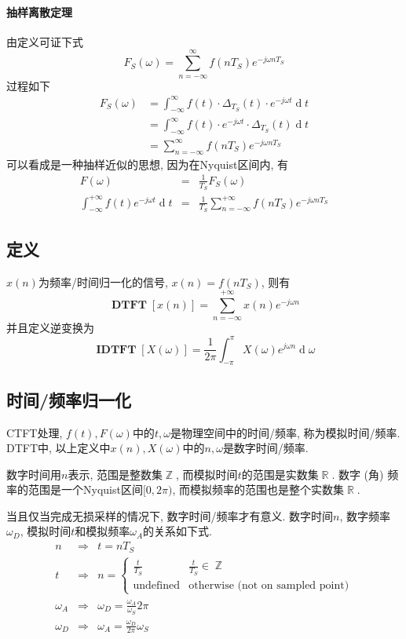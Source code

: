 \documentclass{ctexart}
\DeclareMathOperator{\DTFT}{\mathbf{DTFT}}
\DeclareMathOperator{\IDTFT}{\mathbf{IDTFT}}
\DeclareMathOperator{\ud}{\mathrm{d}}
\DeclareMathOperator{\Rset}{\mathbb{R}}
\DeclareMathOperator{\Zset}{\mathbb{Z}}
\begin{document}
\paragraph{抽样离散定理} 由定义可证下式
    \[F_S(\omega) = \sum_{n=-\infty}^{\infty} f(nT_S) e^{- j \omega n T_S}\]过程如下
    \begin{align*}
        F_S(\omega) &= \int_{-\infty}^{\infty} f(t) \cdot \Delta_{T_S}(t) \cdot e^{-j \omega t} \ud t\\
            &= \int_{-\infty}^{\infty} f(t) \cdot e^{-j \omega t} \cdot \Delta_{T_S}(t) \ud t\\
            &= \sum_{n=-\infty}^{\infty} f(nT_S) e^{-j \omega nT_S}
    \end{align*}
    可以看成是一种抽样近似的思想, 因为在Nyquist区间内, 有\begin{eqnarray*}
        F(\omega) &=& \frac{1}{T_S} F_S(\omega)\\
        \int_{-\infty}^{+\infty} f(t) e^{-j \omega t} \ud t &=& \frac{1}{T_S} \sum_{n = -\infty}^{+\infty} f(nT_S) e^{-j \omega nT_S}
    \end{eqnarray*}

\subsection{定义} $x(n)$为频率/时间归一化的信号, $x(n) = f(nT_S)$, 则有\[
    \DTFT[x(n)] = \sum_{n = -\infty}^{+\infty} x(n) e^{-j \omega n} \]
    并且定义逆变换为 \[
    \IDTFT[X(\omega)] = \frac{1}{2\pi} \int_{-\pi}^{\pi} X(\omega) e^{j \omega n} \ud \omega\]

\subsection{时间/频率归一化}
    CTFT处理, $f(t), F(\omega)$中的$t, \omega$是物理空间中的时间/频率, 称为模拟时间/频率.
    DTFT中, 以上定义中$x(n), X(\omega)$中的$n, \omega$是数字时间/频率.\par
    数字时间用$n$表示, 范围是整数集$\Zset$, 而模拟时间$t$的范围是实数集$\Rset$.
    数字 (角) 频率的范围是一个Nyquist区间$[0, 2\pi)$, 而模拟频率的范围也是整个实数集$\Rset$.\par
    当且仅当完成无损采样的情况下, 数字时间/频率才有意义.
    数字时间$n$, 数字频率$\omega_D$, 模拟时间$t$和模拟频率$\omega_A$的关系如下式.
    \begin{eqnarray*}
        n        & \Rightarrow & t = n T_S                      \\
        t        & \Rightarrow & n =
            \begin{cases} \frac{t}{T_S} & \frac{t}{T_S} \in \Zset \\ \text{undefined} & \text{otherwise (not on sampled point)} \end{cases}\\
        \omega_A & \Rightarrow & \omega_D = \frac{\omega_A}{\omega_S} 2\pi \\
        \omega_D & \Rightarrow & \omega_A = \frac{\omega_D}{2 \pi} \omega_S
    \end{eqnarray*}
\end{document}
